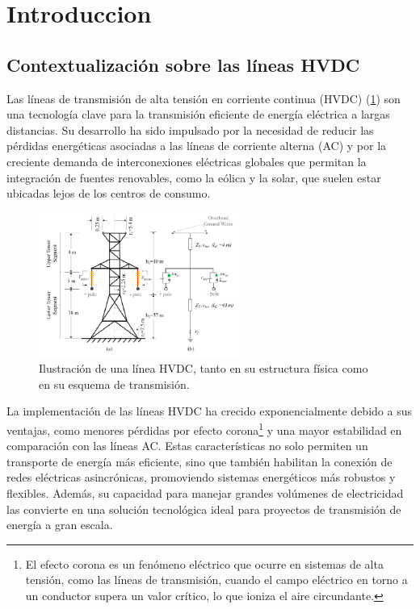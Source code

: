 \section{Introduccion}
\subsection{Contextualización sobre las líneas HVDC}
Las líneas de transmisión de alta tensión en corriente continua (HVDC) (\ref{fig:figure_1}) son una tecnología clave para la transmisión eficiente de energía eléctrica a largas distancias. Su desarrollo ha sido impulsado por la necesidad de reducir las pérdidas energéticas asociadas a las líneas de corriente alterna (AC) y por la creciente demanda de interconexiones eléctricas globales que permitan la integración de fuentes renovables, como la eólica y la solar, que suelen estar ubicadas lejos de los centros de consumo. 
\begin{figure}
	\centering
	\includegraphics[width=0.6\textwidth]{img/ejemplos/Figure_1}
	\caption{Ilustración de una línea HVDC, tanto en su estructura física como en su esquema de transmisión.}
	\label{fig:figure_1}
\end{figure}
La implementación de las líneas HVDC ha crecido exponencialmente debido a sus ventajas, como menores pérdidas por efecto corona\footnote{El efecto corona es un fenómeno eléctrico que ocurre en sistemas de alta tensión, como las líneas de transmisión, cuando el campo eléctrico en torno a un conductor supera un valor crítico, lo que ioniza el aire circundante.} y una mayor estabilidad en comparación con las líneas AC. Estas características no solo permiten un transporte de energía más eficiente, sino que también habilitan la conexión de redes eléctricas asincrónicas, promoviendo sistemas energéticos más robustos y flexibles. Además, su capacidad para manejar grandes volúmenes de electricidad las convierte en una solución tecnológica ideal para proyectos de transmisión de energía a gran escala.\\

